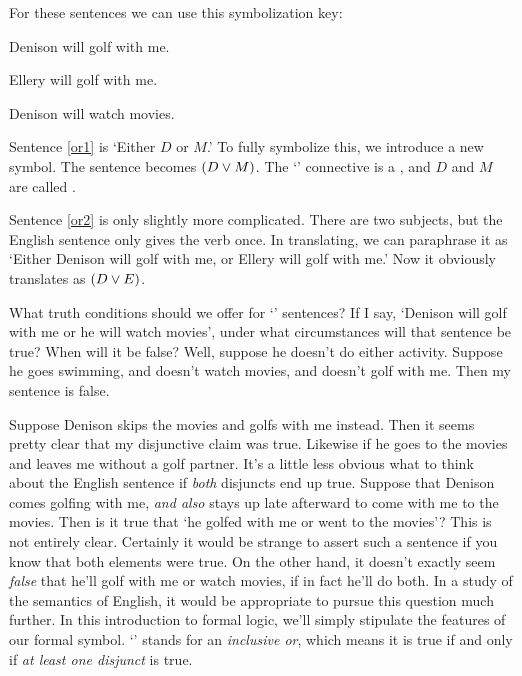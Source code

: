 For these sentences we can use this symbolization key:

\begin{ekey}
\item[D:] Denison will golf with me.
\item[E:] Ellery will golf with me.
\item[M:] Denison will watch movies.
\end{ekey}

Sentence \ref{or1} is `Either $D$ or $M$.' To fully symbolize this, we introduce a new symbol. The sentence becomes $(D \vee M)$. The `\eor' connective is a , and $D$ and $M$ are called .

Sentence \ref{or2} is only slightly more complicated. There are two subjects, but the English sentence only gives the verb once. In translating, we can paraphrase it as `Either Denison will golf with me, or Ellery will golf with me.' Now it obviously translates as $(D \vee E)$.


What truth conditions should we offer for `\eor' sentences? If I say, `Denison will golf with me or he will watch movies', under what circumstances will that sentence be true? When will it be false? Well, suppose he doesn't do either activity. Suppose he goes swimming, and doesn't watch movies, and doesn't golf with me. Then my sentence is false.

Suppose Denison skips the movies and golfs with me instead. Then it seems pretty clear that my disjunctive claim was true. Likewise if he goes to the movies and leaves me without a golf partner. It's a little less obvious what to think about the English sentence if \emph{both} disjuncts end up true. Suppose that Denison comes golfing with me, \emph{and also} stays up late afterward to come with me to the movies. Then is it true that `he golfed with me or went to the movies'? This is not entirely clear. Certainly it would be strange to assert such a sentence if you know that both elements were true. On the other hand, it doesn't exactly seem \emph{false} that he'll golf with me or watch movies, if in fact he'll do both. In a study of the semantics of English, it would be appropriate to pursue this question much further. In this introduction to formal logic, we'll simply stipulate the features of our formal symbol. `\eor' stands for an \emph{inclusive or}, which means it is true if and only if \emph{at least one disjunct} is true.

